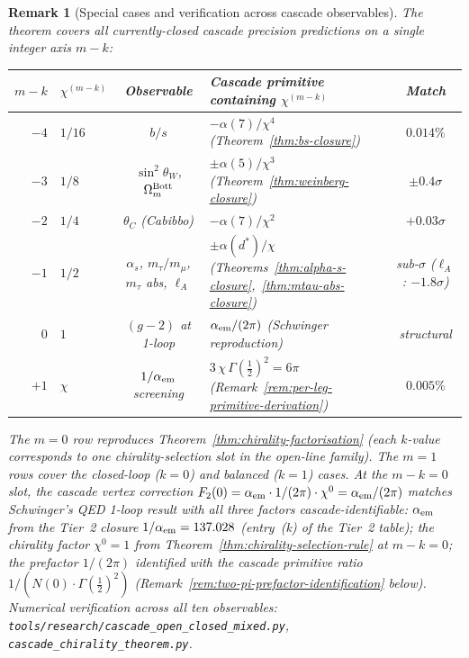 \documentclass[12pt,a4paper]{article}
\newtheorem*{remark}{Remark}
\begin{document}
\begin{remark}[Special cases and verification across cascade observables]\label{rem:chirality-special-cases}
The theorem covers all currently-closed cascade precision predictions on a single integer axis $m - k$:
\begin{center}
\renewcommand{\arraystretch}{1.25}
\begin{tabular}{rlclc}
\toprule
$m-k$ & $\chi^{(m-k)}$ & Observable & Cascade primitive containing $\chi^{(m-k)}$ & Match \\
\midrule
$-4$ & $1/16$ & $b/s$ & $-\alpha(7)/\chi^4$ (Theorem~\ref{thm:bs-closure}) & $0.014\%$ \\
$-3$ & $1/8$ & $\sin^2\theta_W$, $\Omega_m^{\rm Bott}$ & $\pm\alpha(5)/\chi^3$ (Theorem~\ref{thm:weinberg-closure}) & $\pm 0.4\sigma$ \\
$-2$ & $1/4$ & $\theta_C$ (Cabibbo) & $-\alpha(7)/\chi^2$ & $+0.03\sigma$ \\
$-1$ & $1/2$ & $\alpha_s$, $m_\tau/m_\mu$, $m_\tau$ abs, $\ell_A$ & $\pm\alpha(d^*)/\chi$ (Theorems~\ref{thm:alpha-s-closure},~\ref{thm:mtau-abs-closure}) & sub-$\sigma$ ($\ell_A$: $-1.8\sigma$) \\
$0$ & $1$ & $(g{-}2)$ at 1-loop & $\alpha_{\rm em}/(2\pi)$ (Schwinger reproduction) & structural \\
$+1$ & $\chi$ & $1/\alpha_{\rm em}$ screening & $3\,\chi\,\Gamma(\tfrac{1}{2})^2 = 6\pi$ (Remark~\ref{rem:per-leg-primitive-derivation}) & $0.005\%$ \\
\bottomrule
\end{tabular}
\end{center}
The $m = 0$ row reproduces Theorem~\ref{thm:chirality-factorisation} (each $k$-value corresponds to one chirality-selection slot in the open-line family). The $m = 1$ rows cover the closed-loop ($k=0$) and balanced ($k=1$) cases. At the $m-k=0$ slot, the cascade vertex correction $F_2(0) = \alpha_{\rm em} \cdot 1/(2\pi) \cdot \chi^{0} = \alpha_{\rm em}/(2\pi)$ matches Schwinger's QED 1-loop result with all three factors cascade-identifiable: $\alpha_{\rm em}$ from the Tier~2 closure $1/\alpha_{\rm em}=137.028$ (entry~(k) of the Tier~2 table); the chirality factor $\chi^0=1$ from Theorem~\ref{thm:chirality-selection-rule} at $m-k=0$; the prefactor $1/(2\pi)$ identified with the cascade primitive ratio $1/(N(0)\cdot\Gamma(\tfrac{1}{2})^2)$ (Remark~\ref{rem:two-pi-prefactor-identification} below). Numerical verification across all ten observables: \texttt{tools/research/cascade\_open\_closed\_mixed.py}, \texttt{cascade\_chirality\_theorem.py}.
\end{remark}
\end{document}

